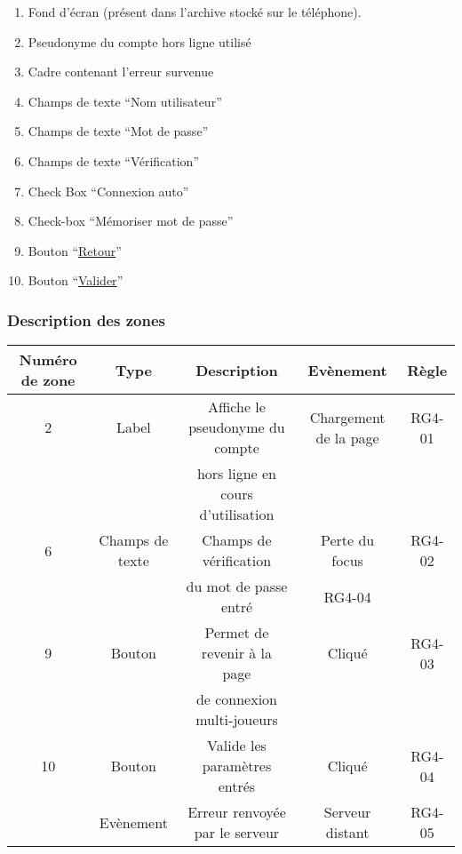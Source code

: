 \documentclass{report}
\begin{document}
		\hypertarget{Creation compte multi-joueurs}{}
		\label{Creation compte multi-joueurs}
	
		\begin{center}
			
		\end{center}
		
		\begin{enumerate}
		  \item Fond d'écran (présent dans l'archive stocké sur le téléphone).
		  \item Pseudonyme du compte hors ligne utilisé
		  \item Cadre contenant l'erreur survenue
		  \item Champs de texte ``Nom utilisateur''
		  \item Champs de texte ``Mot de passe''
		  \item Champs de texte ``Vérification''
		  \item Check Box ``Connexion auto''
		  \item Check-box ``Mémoriser mot de passe''
		  \item Bouton ``\hyperlink{Connexion multi-joueurs}{Retour}''
		  \item Bouton ``\hyperlink{Accueil multi-joueurs}{Valider}''
		\end{enumerate}
		
		\subsubsection{Description des zones}
		
			\begin{tabular}{|c|c|c|c|c|} \hline
				Numéro de zone & Type  & Description & Evènement &	Règle \\\hline
				2 & Label & Affiche le pseudonyme du compte & Chargement de la page & RG4-01 \\
				  &       & hors ligne en cours d'utilisation & & \\\hline
				6 & Champs de texte & Champs de vérification & Perte du focus & RG4-02 \\
				  & & du mot de passe entré & RG4-04 & \\\hline 
				9 & Bouton & Permet de revenir à la page & Cliqué & RG4-03 \\
				  &        & de connexion multi-joueurs \footnotemark[1] & & \\\hline
				10 & Bouton & Valide les paramètres entrés & Cliqué & RG4-04 \\\hline
				   & Evènement & Erreur renvoyée par le serveur & Serveur distant & RG4-05 \\\hline
			\end{tabular}
			
\end{document}
